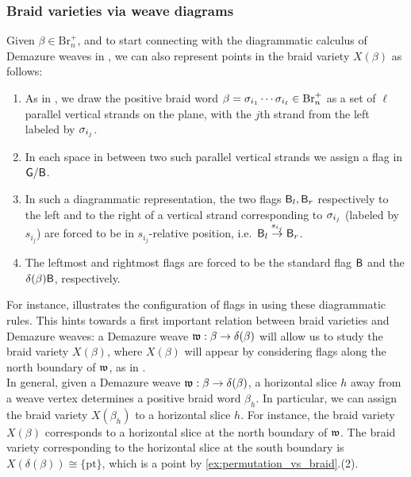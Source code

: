 \subsubsection{Braid varieties via weave diagrams}\label{sssec:first_connection_weave_diagrams} Given $\beta\in\mbox{Br}_n^+$, and to start connecting with the diagrammatic calculus of Demazure weaves in , we can also represent points in the braid variety $X(\beta)$ as follows:

\begin{enumerate}
    \item As in , we draw the positive braid word $\beta=\sigma_{i_1}\cdots \sigma_{i_\ell}\in \mbox{Br}_n^+$ as a set of $\ell$ parallel vertical strands on the plane, with the $j$th strand from the left labeled by $\sigma_{i_j}$.\\

    \item In each space in between two such parallel vertical strands we assign a flag in $\mathsf{G}/\mathsf{B}$.\\

    \item In such a diagrammatic representation, the two flags $\mathsf{B}_l,\mathsf{B}_r$ respectively to the left and to the right of a vertical strand corresponding to $\sigma_{i_j}$ (labeled by $s_{i_j}$) are forced to be in $s_{i_j}$-relative position, i.e.~$\mathsf{B}_l\stackrel{s_{i_j}}{\to}\mathsf{B}_r$.\\

    \item The leftmost and rightmost flags are forced to be the standard flag $\mathsf{B}$ and the $\delta(\beta)\mathsf{B}$, respectively.
\end{enumerate}

\noindent For instance,  illustrates the configuration of flags in  using these diagrammatic rules. This hints towards a first important relation between braid varieties and Demazure weaves: a Demazure weave $\mathfrak{w}:\beta\to\delta(\beta)$ will allow us to study the braid variety $X(\beta)$, where $X(\beta)$ will appear by considering flags along the north boundary of $\mathfrak{w}$, as in .\\

\noindent In general, given a Demazure weave $\mathfrak{w}:\beta\to\delta(\beta)$, a horizontal slice $h$ away from a weave vertex determines a positive braid word $\beta_h$. In particular, we can assign the braid variety $X(\beta_h)$ to a horizontal slice $h$. For instance, the braid variety $X(\beta)$ corresponds to a horizontal slice at the north boundary of $\mathfrak{w}$. The braid variety corresponding to the horizontal slice at the south boundary is $X(\delta(\beta))\cong\{\mbox{pt}\}$, which is a point by \cref{ex:permutation_vs_braid}.(2).

